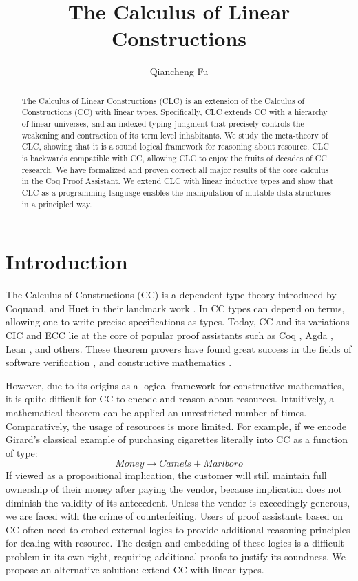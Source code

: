 \documentclass{article}
\title{The Calculus of Linear Constructions}
\author{Qiancheng Fu}
\theoremstyle{definition}
\begin{document}
  \maketitle 
  \begin{abstract}
    The Calculus of Linear Constructions (CLC) is an extension of the Calculus of Constructions (CC) with linear types. Specifically, CLC extends CC with a hierarchy of linear universes, and an indexed typing judgment that precisely controls the weakening and contraction of its term level inhabitants. We study the meta-theory of CLC, showing that it is a sound logical framework for reasoning about resource. CLC is backwards compatible with CC, allowing CLC to enjoy the fruits of decades of CC research. We have formalized and proven correct all major results of the core calculus in the Coq Proof Assistant. We extend CLC with linear inductive types and show that CLC as a programming language enables the manipulation of mutable data structures in a principled way.
  \end{abstract}

  \section{Introduction}
  The Calculus of Constructions (CC) is a dependent type theory introduced by Coquand, and Huet in their landmark work \cite{cc}. In CC types can depend on terms, allowing one to write precise specifications as types. Today, CC and its variations CIC \cite{cic} and ECC \cite{ecc} lie at the core of popular proof assistants such as Coq \cite{coq}, Agda \cite{agda}, Lean \cite{lean}, and others. These theorem provers have found great success in the fields of software verification \cite{compcert,deepspec}, and constructive mathematics \cite{four-color,schemes}. 
  
  However, due to its origins as a logical framework for constructive mathematics, it is quite difficult for CC to encode and reason about resources. Intuitively, a mathematical theorem can be applied an unrestricted number of times. Comparatively, the usage of resources is more limited. For example, if we encode Girard's classical example \cite{girard95} of purchasing cigarettes literally into CC as a function of type:
  \begin{equation*}
    Money \rightarrow Camels + Marlboro
  \end{equation*}
  If viewed as a propositional implication, the customer will still maintain full ownership of their money after paying the vendor, because implication does not diminish the validity of its antecedent. Unless the vendor is exceedingly generous, we are faced with the crime of counterfeiting. Users of proof assistants based on CC often need to embed external logics \cite{bedrock} to provide additional reasoning principles for dealing with resource. The design and embedding of these logics is a difficult problem in its own right, requiring additional proofs to justify its soundness. We propose an alternative solution: extend CC with linear types.
\end{document}
